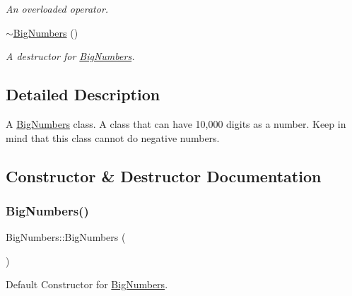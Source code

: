 \begin{DoxyCompactItemize}
\begin{DoxyCompactList}\small\item\em An overloaded operator. \end{DoxyCompactList}\item 
\mbox{\label{class_big_numbers_aa5d87b5aecd5091822bdf7e102b13d5f}} 
\mbox{\hyperlink{class_big_numbers_aa5d87b5aecd5091822bdf7e102b13d5f}{$\sim$\+Big\+Numbers}} ()
\begin{DoxyCompactList}\small\item\em A destructor for \mbox{\hyperlink{class_big_numbers}{Big\+Numbers}}. \end{DoxyCompactList}\end{DoxyCompactItemize}


\subsection{Detailed Description}
A \mbox{\hyperlink{class_big_numbers}{Big\+Numbers}} class. A class that can have 10,000 digits as a number. Keep in mind that this class cannot do negative numbers. 

\subsection{Constructor \& Destructor Documentation}
\mbox{\label{class_big_numbers_af3dd82883f10f3473ac83280f26b0ad8}} 
\subsubsection{\texorpdfstring{Big\+Numbers()}{BigNumbers()}\hspace{0.1cm}{\footnotesize\ttfamily [1/2]}}
{\footnotesize\ttfamily Big\+Numbers\+::\+Big\+Numbers (\begin{DoxyParamCaption}{ }\end{DoxyParamCaption})}



Default Constructor for \mbox{\hyperlink{class_big_numbers}{Big\+Numbers}}. 

